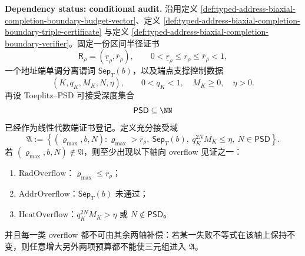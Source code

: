 \begin{proposition}\label{distill:euclid_elements-lifted_congruence_and_residual_rigidity_families-boundary-axiswise-overflow-normal-form}
\textbf{Dependency status: conditional audit.}
沿用定义 \ref{def:typed-address-biaxial-completion-boundary-budget-vector}、定义 \ref{def:typed-address-biaxial-completion-boundary-triple-certificate} 与定义 \ref{def:typed-address-biaxial-completion-boundary-verifier}。固定一份区间半径证书
\[
\mathsf R_\rho=(\underline r_\rho,\overline r_\rho),\qquad
0<\underline r_\rho\le r_\rho\le\overline r_\rho<1,
\]
一个地址端单调分离谓词 \(\mathsf{Sep}_T(b)\)，以及端点支撑控制数据
\[
(K,q_K,M_K,N,\eta),\qquad 0<q_K<1,\quad M_K\ge0,\quad \eta>0.
\]
再设 Toeplitz--PSD 可接受深度集合
\[
\mathsf{PSD}\subseteq\NN
\]
已经作为线性代数端证书登记。定义充分接受域
\[
\mathfrak A
:=
\left\{(\varrho_{\max},b,N):
\varrho_{\max}>\overline r_\rho,\ \mathsf{Sep}_T(b),\ q_K^{2N}M_K\le\eta,\ N\in\mathsf{PSD}
\right\}.
\]
若 \((\varrho_{\max},b,N)\notin\mathfrak A\)，则至少出现以下轴向 overflow 见证之一：
\begin{enumerate}
  \item \(\mathrm{RadOverflow}\)：\(\varrho_{\max}\le\overline r_\rho\)；
  \item \(\mathrm{AddrOverflow}\)：\(\mathsf{Sep}_T(b)\) 未通过；
  \item \(\mathrm{HeatOverflow}\)：\(q_K^{2N}M_K>\eta\) 或 \(N\notin\mathsf{PSD}\)。
\end{enumerate}
并且每一类 overflow 都不可由其余两轴补偿：若某一失败不等式在该轴上保持不变，则任意增大另外两项预算都不能使三元组进入 \(\mathfrak A\)。
\end{proposition}

